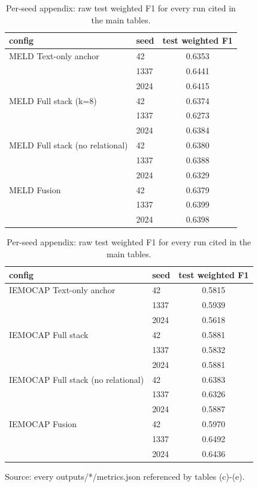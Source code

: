 \begin{table}[t]
\centering
\caption{Per-seed appendix: raw test weighted F1 for every run cited in the main tables.}
\label{tab:per-seed-appendix}
\begin{minipage}{0.48\textwidth}
\centering
\small
\setlength{\tabcolsep}{3.5pt}
\begin{tabular}{p{3.5cm}lc}
\toprule
config & seed & test weighted F1 \\
\midrule
MELD Text-only anchor & 42 & 0.6353 \\
 & 1337 & 0.6441 \\
 & 2024 & 0.6415 \\
\addlinespace
MELD Full stack (k=8) & 42 & 0.6374 \\
 & 1337 & 0.6273 \\
 & 2024 & 0.6384 \\
\addlinespace
MELD Full stack (no relational) & 42 & 0.6380 \\
 & 1337 & 0.6388 \\
 & 2024 & 0.6329 \\
\addlinespace
MELD Fusion & 42 & 0.6379 \\
 & 1337 & 0.6399 \\
 & 2024 & 0.6398 \\
\bottomrule
\end{tabular}
\end{minipage}%
\hfill
\begin{minipage}{0.48\textwidth}
\centering
\small
\setlength{\tabcolsep}{3.5pt}
\begin{tabular}{p{3.5cm}lc}
\toprule
config & seed & test weighted F1 \\
\midrule
IEMOCAP Text-only anchor & 42 & 0.5815 \\
 & 1337 & 0.5939 \\
 & 2024 & 0.5618 \\
\addlinespace
IEMOCAP Full stack & 42 & 0.5881 \\
 & 1337 & 0.5832 \\
 & 2024 & 0.5881 \\
\addlinespace
IEMOCAP Full stack (no relational) & 42 & 0.6383 \\
 & 1337 & 0.6326 \\
 & 2024 & 0.5887 \\
\addlinespace
IEMOCAP Fusion & 42 & 0.5970 \\
 & 1337 & 0.6492 \\
 & 2024 & 0.6436 \\
\bottomrule
\end{tabular}
\end{minipage}
\par\footnotesize Source: every outputs/*/metrics.json referenced by tables (c)-(e).
\end{table}
